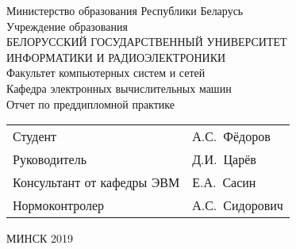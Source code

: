 \begin{titlepage}
  \begin{center}
    Министерство образования Республики Беларусь\\[1em]
    Учреждение образования\\
    БЕЛОРУССКИЙ ГОСУДАРСТВЕННЫЙ УНИВЕРСИТЕТ \\
    ИНФОРМАТИКИ И РАДИОЭЛЕКТРОНИКИ\\[1em]

    Факультет компьютерных систем и сетей \\[0.6cm]

    Кафедра электронных вычислительных машин \\[3.0cm]

    {Отчет по преддипломной практике}\\[4.2cm]

    \begin{tabular}{ p{}p{} }
      Студент & А.С.~Фёдоров  \\[1em]

      Руководитель & Д.И.~Царёв \\[1em]

      Консультант от кафедры ЭВМ & Е.А.~Сасин\\[1em]

      Нормоконтролер & А.С.~Сидорович\\
    \end{tabular}

    \vfill
    {\normalsize МИНСК 2019}
  \end{center}
\end{titlepage}
